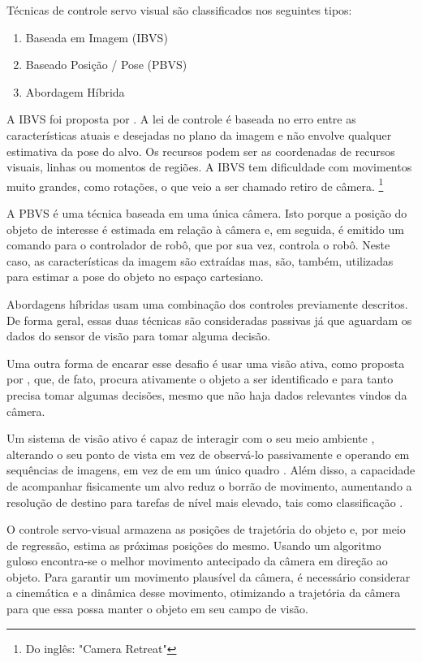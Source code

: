 Técnicas de controle servo visual são classificados nos seguintes tipos:
\begin{enumerate}
     \item Baseada em Imagem (IBVS)
     \item Baseado Posição / Pose  (PBVS)
     \item Abordagem Híbrida
\end{enumerate}

A IBVS foi proposta por . A lei de controle é baseada no erro entre as características atuais e desejadas no plano da imagem e não envolve qualquer estimativa da pose do alvo. Os recursos podem ser as coordenadas de recursos visuais, linhas ou momentos de regiões. A IBVS tem dificuldade com movimentos muito grandes, como rotações, o que veio a ser chamado retiro de câmera. \footnote{Do inglês: "Camera Retreat"}

A PBVS é uma técnica baseada em uma única câmera. Isto porque a posição do objeto de interesse é estimada em relação à câmera e, em seguida, é emitido um comando para o controlador de robô, que por sua vez, controla o robô. Neste caso, as características da imagem são extraídas mas, são, também, utilizadas para estimar a pose do objeto no espaço cartesiano.

Abordagens híbridas usam uma combinação dos controles previamente descritos. De forma geral, essas duas técnicas são consideradas passivas já que aguardam os dados do sensor de visão para tomar alguma decisão. 

Uma outra forma de encarar esse desafio é usar uma visão ativa, como proposta por , que, de fato, procura ativamente o objeto a ser identificado e para tanto precisa tomar algumas decisões, mesmo que não haja dados relevantes vindos da câmera. 

Um sistema de visão ativo é capaz de interagir com o seu meio ambiente \cite{Tsotsos}, alterando o seu ponto de vista em vez de observá-lo passivamente e operando em sequências de imagens, em vez de em um único quadro \cite{Walther}. Além disso, a capacidade de acompanhar fisicamente um alvo reduz o borrão de movimento, aumentando a resolução de destino para tarefas de nível mais elevado, tais como classificação  \cite{Walther}. 

O controle servo-visual armazena as posições de trajetória do objeto e, por meio de regressão, estima as próximas posições do mesmo.  	Usando um algoritmo guloso encontra-se o melhor movimento antecipado da câmera em direção ao objeto. Para garantir um movimento plausível da câmera, é necessário considerar a cinemática e a dinâmica desse movimento, otimizando a trajetória da câmera para que essa possa manter o objeto em seu campo de visão.

